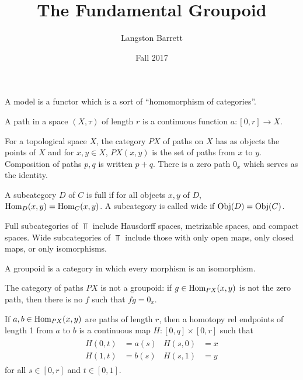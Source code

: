 \documentclass[a5paper]{article}
\begin{document}
\title{The Fundamental Groupoid}
\author{Langston Barrett}
\date{Fall 2017}
\maketitle

\begin{definition*}[Model]
	A model is a functor which is a sort of ``homomorphism of categories''. 
\end{definition*}


\begin{definition*}[Path]
	A path in a space $(X,\tau)$ of length $r$ is a continuous function
  $a:[0,r]\to X$. 
\end{definition*}


\begin{definition*}
	For a topological space $X$, the category $PX$ of paths on $X$ has as objects
  the points of $X$ and for $x,y\in X$, $PX(x,y)$ is the set of paths from $x$
  to $y$. Composition of paths $p,q$ is written $p+q$. There is a zero path
  $0_x$ which serves as the identity.
\end{definition*}


\begin{definition*}
	A subcategory $D$ of $C$ is full if for all objects $x,y$ of $D$,
  $\operatorname{Hom}_D(x,y)=\operatorname{Hom}_C(x,y)$. A subcategory is called wide if $\operatorname{Obj}(D)=\operatorname{Obj}(C)$.
\end{definition*}


\begin{example*}
	Full subcategories of $\Top$ include Hausdorff spaces, metrizable spaces, and
  compact spaces. Wide subcategories of $\Top$ include those with only open
  maps, only closed maps, or only isomorphisms.
\end{example*}


\begin{definition*}[Groupoid]
	A groupoid is a category in which every morphism is an isomorphism.
\end{definition*}


\begin{example*}
	The category of paths $PX$ is not a groupoid: if $g\in\operatorname{Hom}_{PX}(x,y)$ is not
  the zero path, then there is no $f$ such that $fg=0_x$.
\end{example*}


\begin{definition*}
	If $a,b\in\operatorname{Hom}_{PX}(x,y)$ are paths of length $r$, then a homotopy rel
  endpoints of length 1 from $a$ to $b$ is a continuous map
  $H:[0,q]\times[0,r]$ such that
  \begin{align*}
    \begin{split}
      H(0,t) &= a(s) \\
      H(1,t) &= b(s)
    \end{split}
    \begin{split}
      H(s,0) &= x \\
      H(s,1) &= y
    \end{split}
  \end{align*}
  for all $s\in [0,r]$ and $t\in [0,1]$.
\end{definition*}
\end{document}
